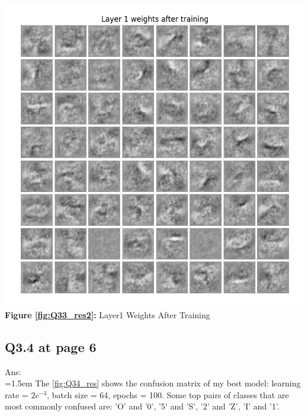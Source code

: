 \documentclass{article}
\begin{document}
	\begin{minipage}{0.48\linewidth}
	\centering
	\includegraphics[width=\linewidth]{./Q33_res2.png}
	\textbf{Figure \ref{fig:Q33_res2}:} Layer1 Weights After Training  %
	\label{fig:Q33_res2}         %
	\end{minipage}		
	
	\newpage
	\subsection*{Q3.4 at page 6}
	Ans:\\
	\hangindent=1.5em \hspace{1.5em}The	\autoref{fig:Q34_res} shows the confusion matrix of my best model: learning rate = $2e^{-3}$, batch size = 64, epochs = 100. Some top pairs of classes that are most commonly confused are: 'O' and '0', '5' and 'S', '2' and 'Z', 'I' and '1'.
	\newline
\end{document}
